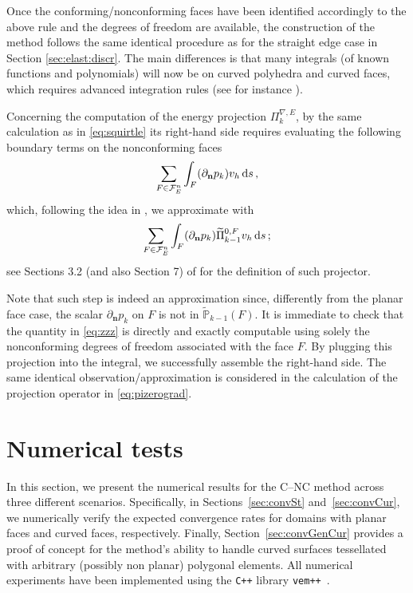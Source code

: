 \documentclass[a4paper,11pt]{article}
\theoremstyle{remark}
\theoremstyle{definition}
\newcommand{\PiNablaE}{\Pi^{\nabla,E}_k}
\begin{document}
Once the conforming/nonconforming faces have been identified accordingly to the above rule and the degrees of freedom are available, the construction of the method follows the same identical procedure as for the straight edge case in Section \ref{sec:elast:discr}. The main differences is that many integrals (of known functions and polynomials) will now be on curved polyhedra and curved faces, which requires advanced integration rules (see for instance \cite{chinsuku,sommariva2009gauss}).

Concerning the computation of the energy projection $\PiNablaE$, by the same calculation as in \eqref{eq:squirtle} its right-hand side requires evaluating the following boundary terms on the nonconforming faces
\[
\sum_{F \in {\cal F}^n_E}
\int_F (\partial_\mathbf{n} p_k) v_h \, {\rm d}s \, ,
\]
which, following the idea in \cite{curvo-Yi}, we approximate with 
\begin{equation}\label{eq:zzz}
\sum_{F \in {\cal F}^n_E}
\int_F (\partial_\mathbf{n} p_k) \widetilde \Pi^{0,F}_{k-1} v_h \, {\rm d}s \, ;
\end{equation}
see Sections 3.2 (and also Section 7) of \cite{curvo-Yi} for the definition of such projector.

Note that such step is indeed an approximation since, differently from the planar face case, the scalar $\partial_\mathbf{n} p_k$ on $F$ is not in $\widetilde{\mathbb P}_{k-1}(F)$.
It is immediate to check that the quantity in \eqref{eq:zzz} is directly and exactly computable using solely the nonconforming degrees of freedom associated with the face $F$. By plugging this projection into the integral, we successfully assemble the right-hand side. The same identical observation/approximation is considered in the calculation of the projection operator in \eqref{eq:pizerograd}.

\section{Numerical tests} \label{sec:4}

In this section, we present the numerical results for the C--NC method across three different scenarios. 
Specifically, in Sections~\ref{sec:convSt} and~\ref{sec:convCur}, we
numerically verify the expected convergence rates for domains with planar faces and curved faces, respectively. 
Finally, Section~\ref{sec:convGenCur} provides a proof of concept for the method's ability 
to handle curved surfaces tessellated with arbitrary (possibly non planar) polygonal elements.
All numerical experiments have been implemented using the \texttt{C++} library \texttt{vem++}~\cite{vem++}.
\end{document}
